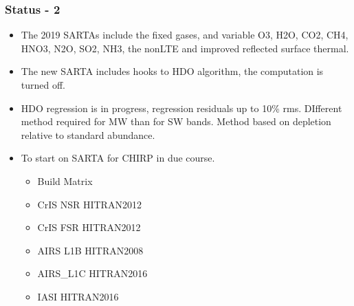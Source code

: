 \documentclass[10pt,t]{beamer}
\begin{document}
\begin{frame}
  \frametitle{Status - 2}
  \begin{itemize}
  \item The 2019 SARTAs include the fixed gases, and variable O3, H2O, CO2, CH4, HNO3, N2O, SO2, NH3, the nonLTE and improved reflected surface thermal. 
  \item The new SARTA includes hooks to HDO algorithm, the computation is turned off.
  \item HDO regression is in progress, regression residuals up to 10\% rms. DIfferent method required for MW than for SW bands. Method based on depletion relative to standard abundance.
  \item To start on SARTA for CHIRP in due course.
    \begin{itemize}
    \item Build Matrix
    \item CrIS NSR HITRAN2012
    \item CrIS FSR HITRAN2012
    \item AIRS L1B HITRAN2008
    \item AIRS\_L1C HITRAN2016
    \item IASI HITRAN2016
    \end{itemize}
    
  \end{itemize}
\end{frame}

    

    
\end{document}
